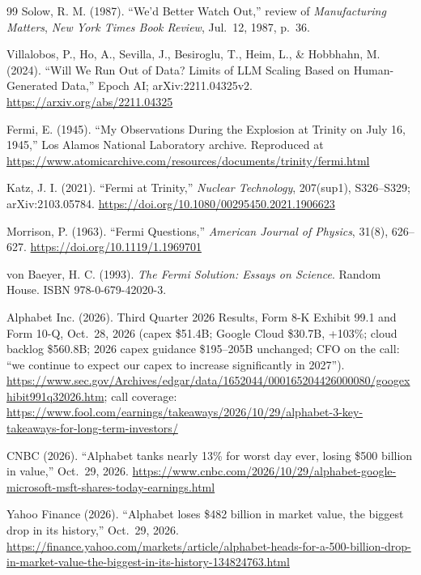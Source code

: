 \documentclass[11pt,letterpaper]{article}
\begin{document}
\begin{thebibliography}{99}
Solow, R. M. (1987). ``We'd Better Watch Out,'' review of \textit{Manufacturing Matters}, \textit{New York Times Book Review}, Jul.~12, 1987, p.~36.

Villalobos, P., Ho, A., Sevilla, J., Besiroglu, T., Heim, L., \& Hobbhahn, M. (2024). ``Will We Run Out of Data? Limits of LLM Scaling Based on Human-Generated Data,'' Epoch AI; arXiv:2211.04325v2. \url{https://arxiv.org/abs/2211.04325}

Fermi, E. (1945). ``My Observations During the Explosion at Trinity on July 16, 1945,'' Los Alamos National Laboratory archive. Reproduced at \url{https://www.atomicarchive.com/resources/documents/trinity/fermi.html}

Katz, J. I. (2021). ``Fermi at Trinity,'' \textit{Nuclear Technology}, 207(sup1), S326--S329; arXiv:2103.05784. \url{https://doi.org/10.1080/00295450.2021.1906623}

Morrison, P. (1963). ``Fermi Questions,'' \textit{American Journal of Physics}, 31(8), 626--627. \url{https://doi.org/10.1119/1.1969701}

von Baeyer, H. C. (1993). \textit{The Fermi Solution: Essays on Science}. Random House. ISBN 978-0-679-42020-3.


Alphabet Inc. (2026). Third Quarter 2026 Results, Form 8-K Exhibit 99.1 and Form 10-Q, Oct.~28, 2026 (capex \$51.4B; Google Cloud \$30.7B, +103\%; cloud backlog \$560.8B; 2026 capex guidance \$195--205B unchanged; CFO on the call: ``we continue to expect our capex to increase significantly in 2027''). \url{https://www.sec.gov/Archives/edgar/data/1652044/000165204426000080/googexhibit991q32026.htm}; call coverage: \url{https://www.fool.com/earnings/takeaways/2026/10/29/alphabet-3-key-takeaways-for-long-term-investors/}

CNBC (2026). ``Alphabet tanks nearly 13\% for worst day ever, losing \$500 billion in value,'' Oct.~29, 2026. \url{https://www.cnbc.com/2026/10/29/alphabet-google-microsoft-msft-shares-today-earnings.html}

Yahoo Finance (2026). ``Alphabet loses \$482 billion in market value, the biggest drop in its history,'' Oct.~29, 2026. \url{https://finance.yahoo.com/markets/article/alphabet-heads-for-a-500-billion-drop-in-market-value-the-biggest-in-its-history-134824763.html}


\end{thebibliography}
\end{document}
